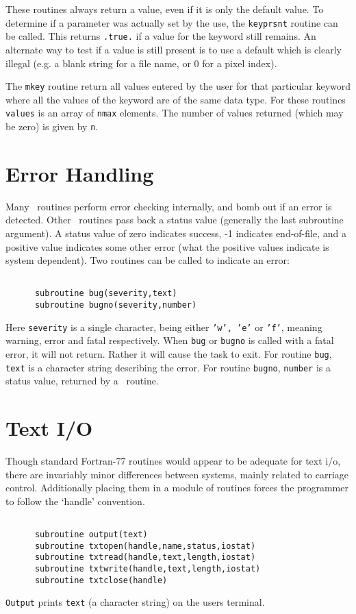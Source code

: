 \documentclass{report}
\begin{document}
These routines always return a value, even if it is only the default
value. To determine if a parameter was actually set by the use, the
{\tt keyprsnt} routine can be called. This returns {\tt .true.} if a value for
the keyword still remains. An alternate way to test if a value is still
present is to use a default which is
clearly illegal (e.g. a blank string for a file name, or 0 for a
pixel index).

The {\tt mkey} routine return all values entered by the user for that
particular keyword where all the values of the keyword are of the same
data type. For these routines {\tt values} is an array of {\tt nmax}
elements. The number of values returned (which may be zero) is given
by {\tt n}.

\section{Error Handling}
Many \miriad\ routines perform error checking internally, and bomb out if an
error is detected. Other \miriad\ routines pass back a status value (generally
the last subroutine argument). A status value of zero indicates success,
-1 indicates end-of-file, and a positive value indicates some other error
(what the positive values indicate is system dependent). Two routines can
be called to indicate an error:
\begin{verbatim}

      subroutine bug(severity,text)
      subroutine bugno(severity,number)

\end{verbatim}
Here {\tt severity} is a single character, being either {\tt 'w', 'e'} or
{\tt 'f'}, meaning warning, error and fatal respectively. When {\tt bug}
or {\tt bugno}
is called with a fatal error, it will not return. Rather it will
cause the task to exit. For routine {\tt bug}, {\tt text} is a character
string describing the error. For routine {\tt bugno}, {\tt number} is a
status value, returned by a \miriad\ routine.

\section{Text I/O}
Though standard Fortran-77 routines would appear to be adequate for text i/o,
there are invariably minor differences between systems, mainly related to
carriage control. Additionally placing them in a module of routines forces
the programmer to follow the `handle' convention.
\begin{verbatim}

      subroutine output(text)
      subroutine txtopen(handle,name,status,iostat)
      subroutine txtread(handle,text,length,iostat)
      subroutine txtwrite(handle,text,length,iostat)
      subroutine txtclose(handle)

\end{verbatim}
{\tt Output} prints {\tt text} (a character string) on the users terminal.
\end{document}
